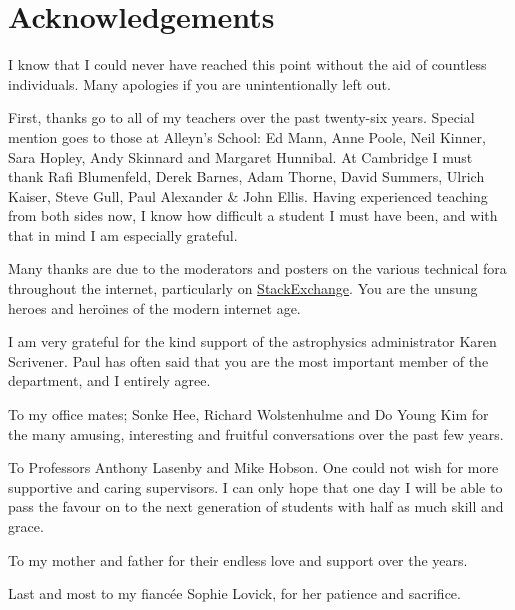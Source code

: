 \chapter{Acknowledgements}

I know that I could never have reached this point without the aid of countless individuals. Many apologies if you are unintentionally left out.

First, thanks go to all of my teachers over the past twenty-six years. Special mention goes to those at Alleyn's School: Ed Mann, Anne Poole, Neil Kinner, Sara Hopley, Andy Skinnard and Margaret Hunnibal. At Cambridge I must thank Rafi Blumenfeld, Derek Barnes, Adam Thorne, David Summers, Ulrich Kaiser, Steve Gull, Paul Alexander \& John Ellis. Having experienced teaching from both sides now, I know how difficult a student I must have been, and with that in mind I am especially grateful.

Many thanks are due to the moderators and posters on the various technical fora throughout the internet, particularly on \mbox{\href{http://stackexchange.com/}{StackExchange}}. You are the unsung heroes and hero\"{\i}nes of the modern internet age.

I am very grateful for the kind support of the astrophysics administrator Karen Scrivener. Paul has often said that you are the most important member of the department, and I entirely agree.

To my office mates; Sonke Hee, Richard Wolstenhulme and Do Young Kim for the many amusing, interesting and fruitful conversations over the past few years. 

To Professors Anthony Lasenby and Mike Hobson. One could not wish for more supportive and caring supervisors. I can only hope that one day I will be able to pass the favour on to the next generation of students with half as much skill and grace.

To my mother and father for their endless love and support over the years. 

Last and most to my fianc\'{e}e Sophie Lovick, for her patience and sacrifice. 



